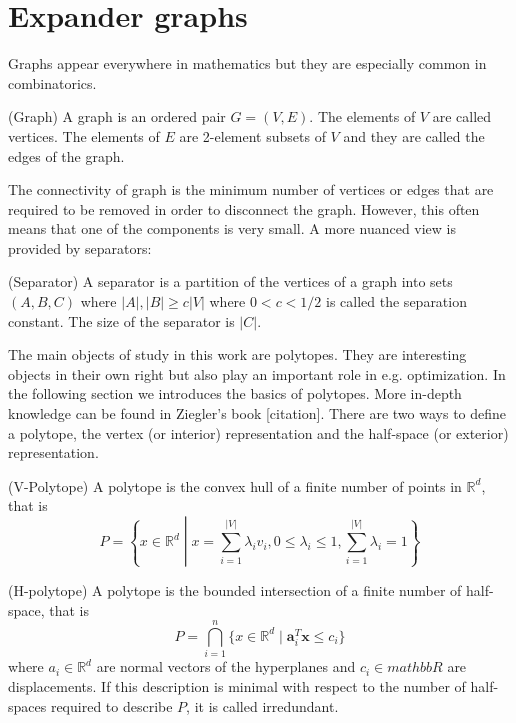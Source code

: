 \chapter{Expander graphs}
\label{mathchapter}

Graphs appear everywhere in mathematics but they are especially common in 
combinatorics. 

\begin{definition}
(Graph) A graph is an ordered pair $G=(V,E)$. The elements of $V$ are called 
vertices. The elements of $E$ are 2-element subsets of $V$ and they are called 
the edges of the graph. 
\end{definition}

The connectivity of graph is the minimum number of vertices or edges that are 
required to be removed in order to disconnect the graph. However, this often 
means that one of the components is very small. A more nuanced view is provided 
by separators:

\begin{definition}
(Separator) A separator is a partition of the vertices of a graph into sets 
$(A,B,C)$ where $|A|, |B| \geq c|V|$ where $0<c<1/2$ is called the separation 
constant. The size of the separator is $|C|$.  
\end{definition}


The main objects of study in this work are polytopes. They are interesting 
objects in their own right but also play an important role in e.g. 
optimization. In the following section we introduces the basics of polytopes. 
More in-depth knowledge can be found in Ziegler's book [citation]. There are 
two ways to define a polytope, the vertex (or interior) representation and the 
half-space (or exterior) representation.

\begin{definition}
(V-Polytope) A polytope is the convex hull of a finite number of points in 
$\mathbb{R}^d$, that is 
\begin{equation}
 P = \left\{x\in \mathbb{R}^d \middle| x = \sum_{i=1}^{|V|} \lambda_i v_i, 
0\leq \lambda_i \leq 1, \sum_{i=1}^{|V|} \lambda_i = 1 \right\}
\end{equation}

\end{definition}

\begin{definition}
 (H-polytope) A polytope is the bounded intersection of a finite number of 
half-space, that is
\begin{equation}
 P = \bigcap_{i=1}^n \{x \in \mathbb{R}^d \mid \mathbf{a}_i^T \mathbf{x} \leq 
c_i \}
\end{equation}
where $a_i \in \mathbb{R}^d$ are normal vectors of the hyperplanes and $c_i \in 
mathbb{R}$ are displacements. If this description is minimal with respect to 
the number of half-spaces required to describe $P$, it is called irredundant.
\end{definition}

